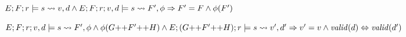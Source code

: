 
\begin{theorem}
$E;F;r \models s \rightsquigarrow v,d \wedge E;F;r;v,d \models s \rightsquigarrow F',\phi \Rightarrow F' = F \wedge \phi(F')$
\end{theorem}

\begin{theorem}
$E;F;r;v,d \models s \rightsquigarrow F',\phi \wedge \phi(G \mathord{++} F' \mathord{++} H) \wedge E;(G \mathord{++} F' \mathord{++} H);r \models s \rightsquigarrow v',d' \Rightarrow v' = v \wedge \mathit{valid}(d) \Leftrightarrow \mathit{valid}(d')$
\end{theorem}
